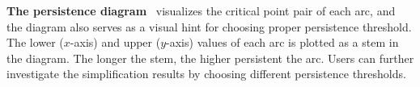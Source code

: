 {\bf The persistence diagram}~\cite{EdelsbrunnerLZ02} visualizes the critical point pair of each arc, and the diagram also serves as a visual hint for choosing proper persistence threshold.  The lower ($x$-axis) and upper ($y$-axis) values of each arc is plotted as a stem in the diagram.  The longer the stem, the higher persistent the arc.  Users can further investigate the simplification results by choosing different persistence thresholds.  




